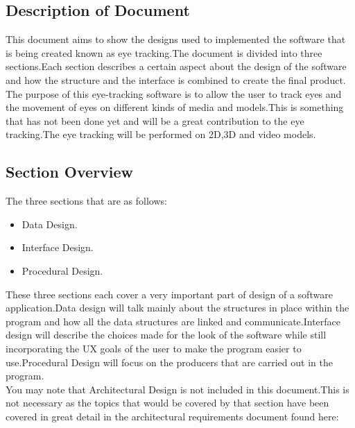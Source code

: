 \subsection{Description of Document}
This document aims to show the designs used to implemented the software that is being created known as eye tracking.The document is divided into three sections.Each section describes a certain aspect about the design of the software and how the structure and the interface is combined to create the final product.
The purpose of this eye-tracking software is to allow the user to track eyes and the movement of eyes on different kinds of media and models.This is something that has not been done yet and will be a great contribution to the eye tracking.The eye tracking will be performed on 2D,3D and video models.
\subsection{Section Overview }
The three sections that are as follows:
\begin{itemize}
\item Data Design.
\item Interface Design.
\item Procedural Design.
\end{itemize}
These three sections each cover a very important part of design of a software application.Data design will talk mainly about the structures in place within the program and how all the data structures are linked and communicate.Interface design will describe the choices made for the look of the software while still incorporating the UX goals of the user to make the program easier to use.Procedural Design will focus on the producers that are carried out in the program.\\
You may note that Architectural Design is not included in this document.This is not necessary as the topics that would be covered by that section have been covered in great detail in the architectural requirements document found here: